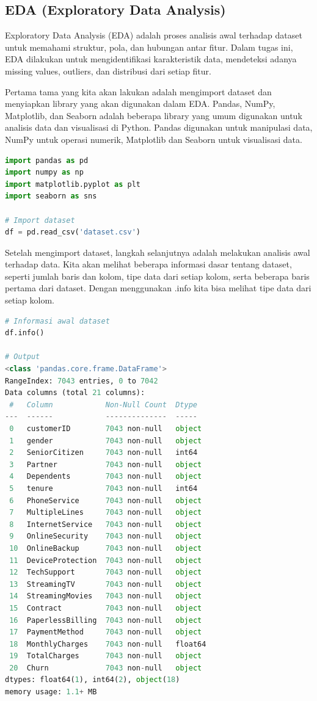 \subsection{EDA (Exploratory Data Analysis)}
Exploratory Data Analysis (EDA) adalah proses analisis awal terhadap dataset untuk memahami struktur, pola, dan hubungan antar fitur. Dalam tugas ini, EDA dilakukan untuk mengidentifikasi karakteristik data, mendeteksi adanya missing values, outliers, dan distribusi dari setiap fitur.

Pertama tama yang kita akan lakukan adalah mengimport dataset dan menyiapkan library yang akan digunakan dalam EDA. Pandas, NumPy, Matplotlib, dan Seaborn adalah beberapa library yang umum digunakan untuk analisis data dan visualisasi di Python. Pandas digunakan untuk manipulasi data, NumPy untuk operasi numerik, Matplotlib dan Seaborn untuk visualisasi data.

\begin{lstlisting}[language=Python, caption=Import Library dan Dataset]
import pandas as pd
import numpy as np
import matplotlib.pyplot as plt
import seaborn as sns

# Import dataset
df = pd.read_csv('dataset.csv')
\end{lstlisting}

Setelah mengimport dataset, langkah selanjutnya adalah melakukan analisis awal terhadap data. Kita akan melihat beberapa informasi dasar tentang dataset, seperti jumlah baris dan kolom, tipe data dari setiap kolom, serta beberapa baris pertama dari dataset. Dengan menggunakan .info kita bisa melihat tipe data dari setiap kolom. 

\begin{lstlisting}[language=Python, caption=Informasi Awal Dataset]
# Informasi awal dataset
df.info()

# Output
<class 'pandas.core.frame.DataFrame'>
RangeIndex: 7043 entries, 0 to 7042
Data columns (total 21 columns):
 #   Column            Non-Null Count  Dtype  
---  ------            --------------  -----  
 0   customerID        7043 non-null   object 
 1   gender            7043 non-null   object 
 2   SeniorCitizen     7043 non-null   int64  
 3   Partner           7043 non-null   object 
 4   Dependents        7043 non-null   object 
 5   tenure            7043 non-null   int64  
 6   PhoneService      7043 non-null   object 
 7   MultipleLines     7043 non-null   object 
 8   InternetService   7043 non-null   object 
 9   OnlineSecurity    7043 non-null   object 
 10  OnlineBackup      7043 non-null   object 
 11  DeviceProtection  7043 non-null   object 
 12  TechSupport       7043 non-null   object 
 13  StreamingTV       7043 non-null   object 
 14  StreamingMovies   7043 non-null   object 
 15  Contract          7043 non-null   object 
 16  PaperlessBilling  7043 non-null   object 
 17  PaymentMethod     7043 non-null   object 
 18  MonthlyCharges    7043 non-null   float64
 19  TotalCharges      7043 non-null   object 
 20  Churn             7043 non-null   object 
dtypes: float64(1), int64(2), object(18)
memory usage: 1.1+ MB

\end{lstlisting}

